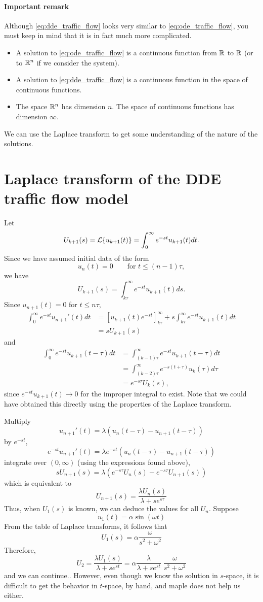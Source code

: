 \paragraph{Important remark}
Although \eqref{eq:dde_traffic_flow} looks very similar to \eqref{eq:ode_traffic_flow}, you must keep in mind that it is in fact much more complicated.
\begin{itemize}
\item
A solution to \eqref{eq:ode_traffic_flow} is a continuous function from $\mathbb{R}$ to $\mathbb{R}$ (or to $\mathbb{R}^n$ if we consider the system).
\item
A solution to \eqref{eq:dde_traffic_flow} is a continuous function in the space of continuous functions.
\item
The space $\mathbb{R}^n$ has dimension $n$. The space of continuous functions has dimension $\infty$.
\end{itemize}
We can use the Laplace transform to get some understanding of the nature of the solutions.




\section{Laplace transform of the DDE traffic flow model}
Let
\[
U_{k+1}(s)=\mathcal{L}\{u_{k+1}(t)\}=\int_0^\infty e^{-st}u_{k+1}(t)dt.
\]
Since we have assumed initial data of the form
\[
u_n(t)=0\qquad\textrm{for } t\leq(n-1)\tau,
\]
we have
\[
U_{k+1}(s)=\int_{k\tau}^\infty e^{-st}u_{k+1}(t)ds.
\]
Since $u_{n+1}(t)=0$ for $t\leq n\tau$,
\begin{align*}
\int_0^\infty e^{-st}u_{n+1}'(t)dt &= \left[u_{k+1}(t)e^{-st}\right]_{k\tau}^\infty +s\int_{k\tau}^\infty e^{-st}u_{k+1}(t)dt \\
&= sU_{k+1}(s)
\end{align*}
and
\begin{align*}
\int_0^\infty e^{-st}u_{k+1}(t-\tau)dt &= \int_{(k-1)\tau}^\infty e^{-st}u_{k+1}(t-\tau)dt \\
&= \int_{(k-2)\tau}^\infty e^{-s(t+\tau)}u_k(\tau)d\tau \\
&= e^{-s\tau}U_k(s),
\end{align*}
since $e^{-st}u_{k+1}(t)\to 0$ for the improper integral to exist.
Note that we could have obtained this directly using the properties of the Laplace transform.

Multiply 
\[
u_{n+1}'(t)=\lambda(u_{n}(t-\tau)-u_{n+1}(t-\tau))
\]
by $e^{-st}$,
\[
e^{-st}u_{n+1}'(t)=\lambda e^{-st}(u_{n}(t-\tau)-u_{n+1}(t-\tau))
\]
integrate over $(0,\infty)$ (using the expressions found above),
\[
sU_{n+1}(s)=\lambda(e^{-s\tau}U_{n}(s)-e^{-s\tau}U_{n+1}(s))
\]
which is equivalent to
\[
U_{n+1}(s)=\frac{\lambda U_n(s)}{\lambda+se^{s\tau}}
\]
Thus, when $U_1(s)$ is known, we can deduce the values for all $U_n$.
Suppose 
\[
u_1(t)=\alpha \sin(\omega t)
\]
From the table of Laplace transforms, it follows that 
\[
U_1(s)=\alpha\frac{\omega}{s^2+\omega^2}
\]
Therefore,
\[
U_2=\frac{\lambda U_1(s)}{\lambda+se^{st}}
=\alpha\frac{\lambda}{\lambda+se^{st}}\;\frac{\omega}{s^2+\omega^2}
\]
and we can continue.. 
\vskip0.5cm
However, even though we know the solution in $s$-space, it is difficult to get the behavior in $t$-space, by hand, and maple does not help us either.

